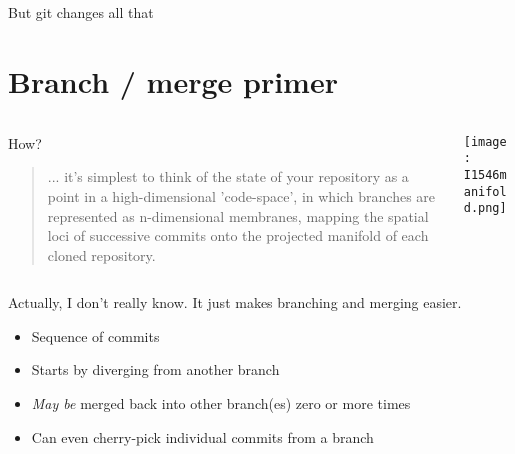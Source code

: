 \documentclass{beamer}
\begin{document}
\begin{frame}

But git changes all that

\end{frame}

\section{Branch / merge primer}

\begin{frame}

  \begin{columns}
    \begin{column}{.5\textwidth}
How?


\begin{small}
  
\begin{quote}
... it's simplest to think of the state of your repository as a point
in a high-dimensional 'code-space', in which branches are represented
as n-dimensional membranes, mapping the spatial loci of successive
commits onto the projected manifold of each cloned repository.
\end{quote}
\end{small}

    \end{column}

    \begin{column}{.5\textwidth}
      \texttt{[image: I1546manifold.png]}      
    \end{column}

  \end{columns}



\end{frame}

\begin{frame}[plain]
Actually, I don't really know.
It just makes branching and merging easier.
\end{frame}

\begin{frame}[plain]

\begin{huge}
\begin{itemize}

\item Sequence of commits
\item Starts by diverging from another branch
\item {\it May be} merged back into other branch(es) zero or more times
\item Can even cherry-pick individual commits from a branch
\end{itemize}
\end{huge}
\end{frame}
\end{document}
